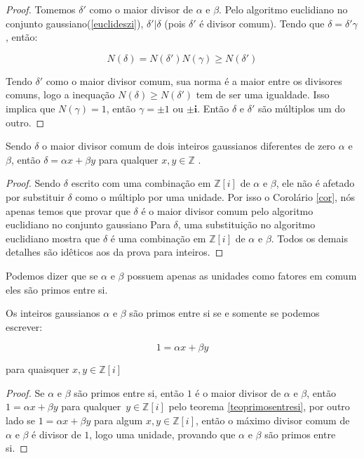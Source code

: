 \begin{proof}
	Tomemos $\delta'$ como o maior divisor de $\alpha$ e $\beta$. Pelo algoritmo euclidiano no conjunto gaussiano(\ref{euclideszi}), $\delta' | \delta$ (pois $\delta'$ \'e divisor comum). Tendo que $\delta = \delta' \gamma$, ent\~ao:

$$N(\delta) = N(\delta')N(\gamma) \geq N(\delta')$$

Tendo $\delta'$ como o maior divisor comum, sua norma \'e a maior entre os divisores comuns, logo a inequa\c{c}\~ao $N(\delta) \geq N(\delta')$ tem de ser uma igualdade. Isso implica que $N(\gamma) = 1$, ent\~ao $\gamma = \pm 1$ ou $\pm \textbf{i}$. Ent\~ao $\delta$ e $\delta'$ s\~ao m\'ultiplos um do outro.

\end{proof}

\begin{Th} \label{teoprimosentresi}
	Sendo $\delta$ o maior divisor comum de dois inteiros gaussianos diferentes de zero $\alpha$ e $\beta$, ent\~ao $\delta = \alpha x + \beta y$ para qualquer $x, y \in \mathbb{Z}$ .
\end{Th}

\begin{proof}
Sendo $\delta$ escrito com uma combina\c{c}\~ao em $\mathbb{Z}[i]$ de $\alpha$ e $\beta$, ele n\~ao \'e afetado por substituir $\delta$ como o m\'ultiplo por uma unidade. Por isso o Corol\'ario \ref{cor}, n\'os apenas temos que provar que $\delta$ \'e o maior divisor comum pelo algoritmo euclidiano no conjunto gaussiano Para $\delta$, uma substitui\c{c}\~ao no algoritmo euclidiano mostra que $\delta$ \'e uma combina\c{c}\~ao em $\mathbb{Z}[i]$ de $\alpha$ e $\beta$. Todos os demais detalhes s\~ao id\^eticos aos da prova para inteiros.

\end{proof}

Podemos dizer que se $\alpha$ e $\beta$ possuem apenas as unidades como fatores em comum eles s\~ao primos entre si. 

\begin{Cor} \label{primosentresi}

Os inteiros gaussianos $\alpha$ e $\beta$ s\~ao primos entre si se e somente se podemos escrever:

$$1 = \alpha x + \beta y$$

para quaisquer $x, y \in \mathbb{Z}[i]$

\end{Cor}

\begin{proof}

Se $\alpha$ e $\beta$ s\~ao primos entre si, ent\~ao $1$ \'e o maior divisor de $\alpha$ e $\beta$, ent\~ao $1 = \alpha x + \beta y$ para qualquer $\, y \in \mathbb{Z}[i]$  pelo teorema \ref{teoprimosentresi}, por outro lado se $1 = \alpha x + \beta y$ para algum $x, y \in \mathbb{Z}[i]$, ent\~ao o m\'aximo divisor comum de $\alpha$ e $\beta$ \'e divisor de $1$, logo uma unidade, provando que $\alpha$ e $\beta$ s\~ao primos entre si.

\end{proof}


